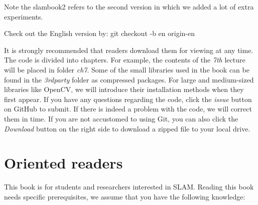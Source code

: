 Note the slambook2 refers to the second version in which we added a lot of extra experiments.

Check out the English version by:
{\hfill git checkout -b en origin-en\hfill}

It is strongly recommended that readers download them for viewing at any time. The code is divided into chapters. For example, the contents of the \textit{7th} lecture will be placed in folder \textit{ch7}. Some of the small libraries used in the book can be found in the \textit{3rdparty} folder as compressed packages. For large and medium-sized libraries like OpenCV, we will introduce their installation methods when they first appear. If you have any questions regarding the code, click the \textit{issue} button on GitHub to submit. If there is indeed a problem with the code, we will correct them in time. If you are not accustomed to using Git, you can also click the  \textit{Download} button on the right side to download a zipped file to your local drive.

\section{Oriented readers}

This book is for students and researchers interested in SLAM. Reading this book needs specific prerequisites, we assume that you have the following knowledge:

